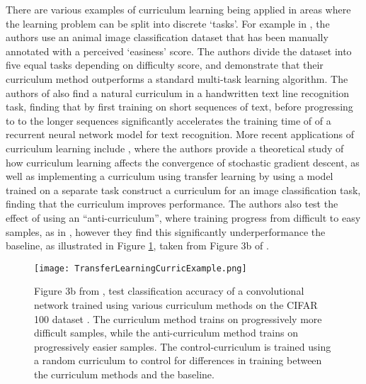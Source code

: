 There are various examples of curriculum learning being applied in areas where the learning problem can be split into discrete `tasks'. For example in \cite{pentina2015curriculum}, the authors use an animal image classification dataset that has been manually annotated with a perceived `easiness' score. The authors divide the dataset into five equal tasks depending on difficulty score, and demonstrate that their curriculum method outperforms a standard multi-task learning algorithm. The authors of \cite{louradour2014curriculum} also find a natural curriculum in a handwritten text line recognition task, finding that by first training on short sequences of text, before progressing to to the longer sequences significantly accelerates the training time of of a recurrent neural network \cite{mikolov2010recurrent} model for text recognition. More recent applications of curriculum learning include \cite{weinshall2018curriculum}, where the authors provide a theoretical study of how curriculum learning affects the convergence of stochastic gradient descent, as well as implementing a curriculum using transfer learning by using a model trained on a separate task construct a curriculum for an image classification task, finding that the curriculum improves performance. The authors also test the effect of using an ``anti-curriculum'', where training progress from difficult to easy samples, as in \cite{avramova2015curriculum}, however they find this significantly underperformance the baseline, as illustrated in Figure \ref{TransferExample}, taken from Figure 3b of \cite{weinshall2018curriculum}. 

\begin{figure}[h!]
\centering
\texttt{[image: TransferLearningCurricExample.png]}
\caption{Figure 3b from  \cite{weinshall2018curriculum}, test classification accuracy of a convolutional network trained using various curriculum methods on the CIFAR 100 dataset \cite{krizhevsky2009learning}. The curriculum method trains on progressively more difficult samples, while the anti-curriculum method trains on progressively easier samples. The control-curriculum is trained using a random curriculum to control for differences in training between the curriculum methods and the baseline.}
\label{TransferExample}
\end{figure}

